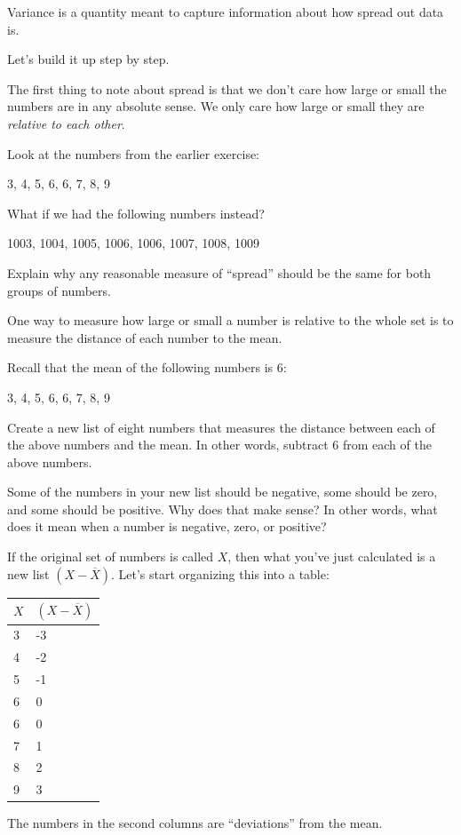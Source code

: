 \documentclass[
]{book}
\begin{document}
Variance is a quantity meant to capture information about how spread out data is.

Let's build it up step by step.

The first thing to note about spread is that we don't care how large or small the numbers are in any absolute sense. We only care how large or small they are \emph{relative to each other}.

Look at the numbers from the earlier exercise:

3, 4, 5, 6, 6, 7, 8, 9

What if we had the following numbers instead?

1003, 1004, 1005, 1006, 1006, 1007, 1008, 1009

Explain why any reasonable measure of ``spread'' should be the same for both groups of numbers.

One way to measure how large or small a number is relative to the whole set is to measure the distance of each number to the mean.

Recall that the mean of the following numbers is 6:

3, 4, 5, 6, 6, 7, 8, 9

Create a new list of eight numbers that measures the distance between each of the above numbers and the mean. In other words, subtract 6 from each of the above numbers.

Some of the numbers in your new list should be negative, some should be zero, and some should be positive. Why does that make sense? In other words, what does it mean when a number is negative, zero, or positive?

If the original set of numbers is called \(X\), then what you've just calculated is a new list \(\left(X - \overline{X}\right)\). Let's start organizing this into a table:

\begin{longtable}[]{@{}ll@{}}
\toprule
\(X\) & \(\left(X - \overline{X}\right)\) \\
\midrule
\endhead
3 & -3 \\
4 & -2 \\
5 & -1 \\
6 & 0 \\
6 & 0 \\
7 & 1 \\
8 & 2 \\
9 & 3 \\
\bottomrule
\end{longtable}

The numbers in the second columns are ``deviations'' from the mean.
\end{document}
